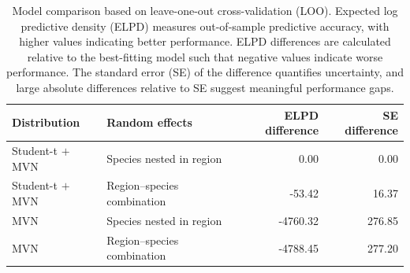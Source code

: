 \documentclass[11pt]{article}
\begin{document}
\renewcommand{\thefigure}{S\arabic{figure}}
\renewcommand{\thetable}{S\arabic{table}}
\setcounter{figure}{0}
\setcounter{table}{0}

\onehalfspacing
\linenumbers
\resetlinenumber
\setcounter{secnumdepth}{0}
\setcounter{page}{1}
\setcounter{equation}{0}
\nolinenumbers




\begin{table}[htbp]
\caption{
Model comparison based on leave-one-out cross-validation (LOO). 
Expected log predictive density (ELPD) measures out-of-sample predictive accuracy, with higher values indicating better performance. 
ELPD differences are calculated relative to the best-fitting model such that negative values indicate worse performance. 
The standard error (SE) of the difference quantifies uncertainty, and large absolute differences relative to SE suggest meaningful performance gaps.
}
\label{tab:loo}
\centering
\begin{tabular}[t]{llrr}
\toprule
Distribution & Random effects & ELPD difference & SE difference\\
\midrule
Student-t $+$ MVN & Species nested in region & 0.00 & 0.00\\
Student-t $+$ MVN & Region–species combination & -53.42 & 16.37\\
MVN & Species nested in region & -4760.32 & 276.85\\
MVN & Region–species combination & -4788.45 & 277.20\\
\bottomrule
\end{tabular}
\end{table}



\newpage
\end{document}
